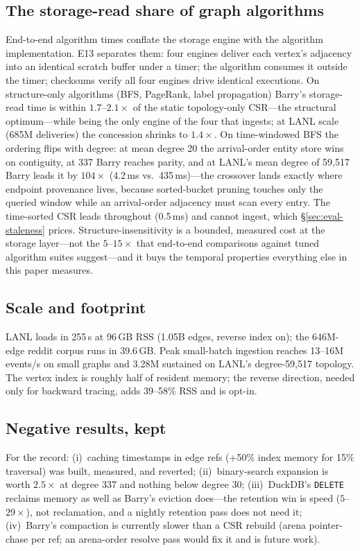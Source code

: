 \documentclass[11pt,letterpaper,twocolumn]{article}
\begin{document}
\subsection{The storage-read share of graph algorithms}
\label{sec:eval-e13}
End-to-end algorithm times conflate the storage engine with the
algorithm implementation. E13 separates them: four engines deliver
each vertex's adjacency into an identical scratch buffer under a
timer; the algorithm consumes it outside the timer; checksums verify
all four engines drive identical executions. On structure-only
algorithms (BFS, PageRank, label propagation) Barry's storage-read
time is within $1.7$--$2.1\times$ of the static topology-only
CSR---the structural optimum---while being the only engine of the
four that ingests; at LANL scale (685M deliveries) the concession
shrinks to $1.4\times$. On time-windowed BFS the ordering flips with
degree: at mean degree 20 the arrival-order entity store wins on
contiguity, at 337 Barry reaches parity, and at LANL's mean degree of
59{,}517 Barry leads it by $104\times$ (4.2\,ms vs.\ 435\,ms)---the
crossover lands exactly where endpoint provenance lives, because
sorted-bucket pruning touches only the queried window while an
arrival-order adjacency must scan every entry. The time-sorted CSR
leads throughout (0.5\,ms) and cannot ingest, which
\S\ref{sec:eval-staleness} prices. Structure-insensitivity is a
bounded, measured cost at the storage layer---not the $5$--$15\times$
that end-to-end comparisons against tuned algorithm suites
suggest---and it buys the temporal properties everything else in this
paper measures.

\subsection{Scale and footprint}
LANL loads in 255\,s at 96\,GB RSS (1.05B edges, reverse index on);
the 646M-edge reddit corpus runs in 39.6\,GB. Peak small-batch
ingestion reaches 13--16M events/s on small graphs and 3.28M
sustained on LANL's degree-59{,}517 topology. The vertex index is
roughly half of resident memory; the reverse direction, needed only
for backward tracing, adds 39--58\% RSS and is opt-in.

\subsection{Negative results, kept}
For the record: (i)~caching timestamps in edge refs (+50\% index
memory for 15\% traversal) was built, measured, and reverted;
(ii)~binary-search expansion is worth $2.5\times$ at degree 337 and
nothing below degree 30; (iii)~DuckDB's \texttt{DELETE} reclaims
memory as well as Barry's eviction does---the retention win is speed
($5$--$29\times$), not reclamation, and a nightly retention pass does
not need it; (iv)~Barry's compaction is currently slower than a CSR
rebuild (arena pointer-chase per ref; an arena-order resolve pass
would fix it and is future work).
\end{document}
